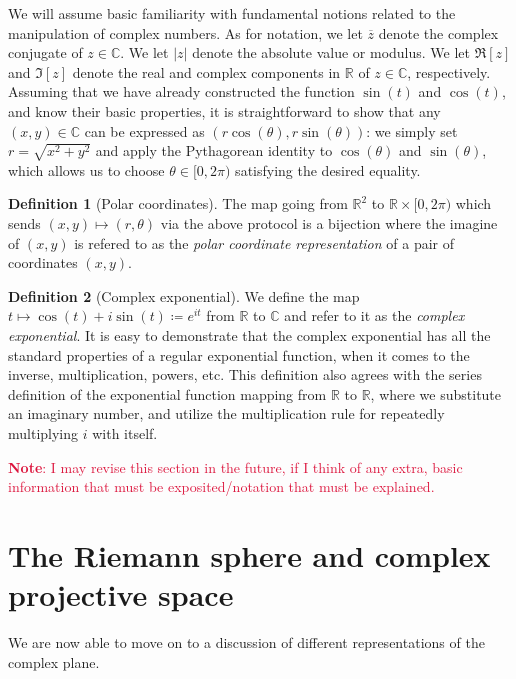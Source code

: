 \documentclass[aps,pra,showpacs,notitlepage,onecolumn,superscriptaddress,nofootinbib]{revtex4-1}
\newcommand{\pop}[1]{\textcolor{crimson}{#1}}
\theoremstyle{definition}
\newtheorem{definition}{Definition}[section]
\begin{document}
We will assume basic familiarity with fundamental notions related to the manipulation of complex numbers. As for notation, we let $\overline{z}$ denote the complex conjugate of $z \in \mathbb{C}$.
We let $|z|$ denote the absolute value or modulus. We let $\Re[z]$ and $\Im[z]$ denote the real and complex components in $\mathbb{R}$ of $z \in \mathbb{C}$, respectively. Assuming that
we have already constructed the function $\sin(t)$ and $\cos(t)$, and know their basic properties, it is straightforward to show that any $(x, y) \in \mathbb{C}$ can be expressed as $(r \cos(\theta), r \sin(\theta))$:
we simply set $r = \sqrt{x^2 + y^2}$ and apply the Pythagorean identity to $\cos(\theta)$ and $\sin(\theta)$, which allows us to choose $\theta \in [0, 2\pi)$ satisfying the desired equality.

\begin{definition}[Polar coordinates]
  The map going from $\mathbb{R}^2$ to $\mathbb{R} \times [0, 2\pi)$ which sends $(x, y) \mapsto (r, \theta)$ via the above protocol is a bijection where the imagine of $(x, y)$ is refered to as the \textit{polar coordinate representation}
    of a pair of coordinates $(x, y)$.
\end{definition}

\begin{definition}[Complex exponential]
  We define the map $t \mapsto  \cos(t) + i \sin(t) \coloneqq e^{it}$ from $\mathbb{R}$ to $\mathbb{C}$ and refer to it as the \textit{complex exponential}. It is easy to demonstrate that
  the complex exponential has all the standard properties of a regular exponential function, when it comes to the inverse, multiplication, powers, etc. This definition also agrees
  with the series definition of the exponential function mapping from $\mathbb{R}$ to $\mathbb{R}$, where we substitute an imaginary number, and utilize the multiplication rule
  for repeatedly multiplying $i$ with itself.
\end{definition}

\noindent \pop{\textbf{Note}: I may revise this section in the future, if I think of any extra, basic information that must be exposited/notation that must be explained.}

\section{The Riemann sphere and complex projective space}

\noindent We are now able to move on to a discussion of different representations of the complex plane.
\end{document}
